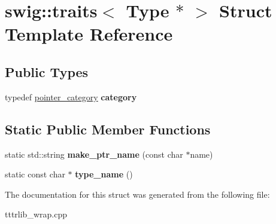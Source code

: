 \hypertarget{structswig_1_1traits_3_01_type_01_5_01_4}{}\section{swig\+:\+:traits$<$ Type $\ast$ $>$ Struct Template Reference}
\label{structswig_1_1traits_3_01_type_01_5_01_4}
\subsection*{Public Types}
\begin{DoxyCompactItemize}
\item 
\mbox{\label{structswig_1_1traits_3_01_type_01_5_01_4_a500d091f0454ce9f328c030b191ac18f}} 
typedef \hyperlink{structswig_1_1pointer__category}{pointer\+\_\+category} {\bfseries category}
\end{DoxyCompactItemize}
\subsection*{Static Public Member Functions}
\begin{DoxyCompactItemize}
\item 
\mbox{\label{structswig_1_1traits_3_01_type_01_5_01_4_a5251b3fb5f48a5a48f17c25cafe21817}} 
static std\+::string {\bfseries make\+\_\+ptr\+\_\+name} (const char $\ast$name)
\item 
\mbox{\label{structswig_1_1traits_3_01_type_01_5_01_4_ac5aae8203a9a4b151f6719e58a0cc252}} 
static const char $\ast$ {\bfseries type\+\_\+name} ()
\end{DoxyCompactItemize}


The documentation for this struct was generated from the following file\+:\begin{DoxyCompactItemize}
\item 
tttrlib\+\_\+wrap.\+cpp\end{DoxyCompactItemize}
